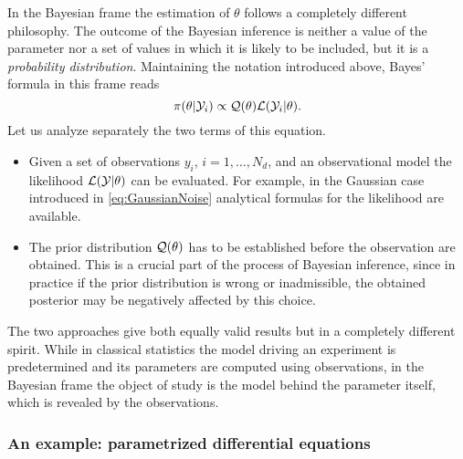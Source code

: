 In the Bayesian frame the estimation of $\theta$ follows a completely different philosophy. The outcome of the Bayesian inference is neither a value of the parameter nor a set of values in which it is likely to be  included, but it is a \textit{probability distribution}. Maintaining the notation introduced above, Bayes' formula in this frame reads
\begin{equation}
	\pi(\theta|\mathcal{Y}_i) \propto \mathcal{Q}(\theta) \mathcal{L}(\mathcal{Y}_i|\theta).
\end{equation}
Let us analyze separately the two terms of this equation.
\begin{itemize}
	\item Given a set of observations $y_i$, $i = 1, \ldots, N_d$, and an observational model the likelihood $\mathcal{L}(\mathcal{Y}|\theta)$ can be evaluated. For example, in the Gaussian case introduced in \eqref{eq:GaussianNoise} analytical formulas for the likelihood are available.
	\item The prior distribution $\mathcal{Q}(\theta)$ has to be established before the observation are obtained. This is a crucial part of the process of Bayesian inference, since in practice if the prior distribution is wrong or inadmissible, the obtained posterior may be negatively affected by this choice.
\end{itemize}
The two approaches give both equally valid results but in a completely different spirit. While in classical statistics the model driving an experiment is predetermined and its parameters are computed using observations, in the Bayesian frame the object of study is the model behind the parameter itself, which is revealed by the observations.

\subsubsection{An example: parametrized differential equations}\label{sect:exBayes}

